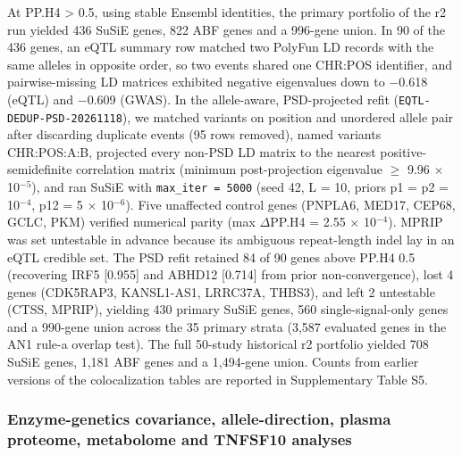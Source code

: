At PP.H4 \textgreater{} 0.5, using stable Ensembl identities, the primary portfolio of the r2 run yielded 436 SuSiE genes, 822 ABF genes and a 996-gene union. In 90 of the 436 genes, an eQTL summary row matched two PolyFun LD records with the same alleles in opposite order, so two events shared one CHR:POS identifier, and pairwise-missing LD matrices exhibited negative eigenvalues down to $-$0.618 (eQTL) and $-$0.609 (GWAS). In the allele-aware, PSD-projected refit (\texttt{EQTL-DEDUP-PSD-20261118}), we matched variants on position and unordered allele pair after discarding duplicate events (95 rows removed), named variants CHR:POS:A:B, projected every non-PSD LD matrix to the nearest positive-semidefinite correlation matrix (minimum post-projection eigenvalue $\ge$ 9.96 $\times$ 10$^{-5}$), and ran SuSiE with \texttt{max\_iter = 5000} (seed 42, L = 10, priors p1 = p2 = 10$^{-4}$, p12 = 5 $\times$ 10$^{-6}$). Five unaffected control genes (PNPLA6, MED17, CEP68, GCLC, PKM) verified numerical parity (max \textbar $\Delta$PP.H4\textbar{} = 2.55 $\times$ 10$^{-4}$). MPRIP was set untestable in advance because its ambiguous repeat-length indel lay in an eQTL credible set. The PSD refit retained 84 of 90 genes above PP.H4 0.5 (recovering IRF5 [0.955] and ABHD12 [0.714] from prior non-convergence), lost 4 genes (CDK5RAP3, KANSL1-AS1, LRRC37A, THBS3), and left 2 untestable (CTSS, MPRIP), yielding 430 primary SuSiE genes, 560 single-signal-only genes and a 990-gene union across the 35 primary strata (3,587 evaluated genes in the AN1 rule-a overlap test). The full 50-study historical r2 portfolio yielded 708 SuSiE genes, 1,181 ABF genes and a 1,494-gene union. Counts from earlier versions of the colocalization tables are reported in Supplementary Table S5.

\subsubsection{Enzyme-genetics covariance, allele-direction, plasma proteome, metabolome and TNFSF10 analyses}\label{enzyme-genetics-methods}

